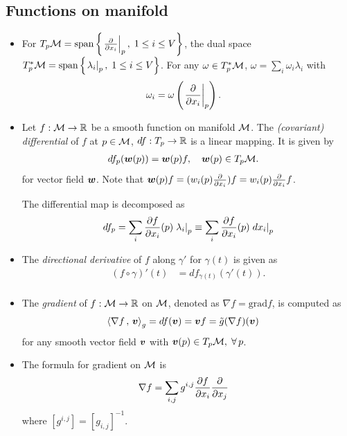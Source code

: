 \documentclass[11pt]{article}
\begin{document}
\subsection{Functions on manifold}
\begin{itemize}
\item For $T_{p}{\mathcal M} = \text{span}\left\{ \left.{\frac{\partial }{ \partial x_{i}}}\right\vert_{p},\; 1\le i\le V\right\}$, the dual space $T^{*}_{p}{\mathcal M}= \text{span}\left\{ \left.{\lambda_{i}}\right\vert_{p},\; 1\le i\le V\right\}$. For any $\omega \in T^{*}_{p}{\mathcal M}$, $\omega =\sum_{i} \omega_{i}\lambda_{i}$ with 
\begin{align*}
\omega_{i} &= \omega\left(\left.{\frac{\partial }{ \partial x_{i}}}\right\vert_{p}\right).
\end{align*}

\item Let $f: {\mathcal M} \rightarrow {\mathbb R}$ be a smooth function on manifold ${\mathcal M}$. The \emph{(covariant) differential} of $f$ at $p\in {\mathcal M}$, $df: T_{p} \rightarrow {\mathbb R}$ is a linear mapping. It is given by 
\begin{align*}
df_{p}(\boldsymbol{w}(p)) &= \boldsymbol{w}(p)f, \quad \boldsymbol{w}(p) \in T_{p}{\mathcal M}.
\end{align*} for vector field $\boldsymbol{w}$. Note that $\boldsymbol{w}(p)f= (w_{i}(p)\frac{\partial }{ \partial x_{i}})f=w_{i}(p)\frac{\partial }{ \partial x_{i}}f$.

The differential map is decomposed as
\begin{align*}
df_{p} &= \sum_{i} \frac{\partial f}{ \partial x_{i}}(p)\left.{\lambda_{i}}\right\vert_{p} \equiv \sum_{i} \frac{\partial f}{ \partial x_{i}}(p)\left.{dx_{i}}\right\vert_{p}\\
\end{align*}

\item The \emph{directional derivative} of $f$ along $\gamma'$ for $\gamma(t)$ is given as
\begin{align*}
(f\circ \gamma)'(t) &= df_{\gamma(t)}(\gamma'(t)).\\
\end{align*}

\item The \emph{gradient} of $f: {\mathcal M}\rightarrow {\mathbb R}$ on ${\mathcal M}$, denoted as $\nabla f = \text{grad} f$, is computed as 
\begin{align*}
\left\langle \nabla f\,,\, \boldsymbol{v} \right\rangle_{g} &= df(\boldsymbol{v}) = \boldsymbol{v}f = \tilde{g}(\nabla f)(\boldsymbol{v})
\end{align*} for any smooth vector field $\boldsymbol{v}$ with $\boldsymbol{v}(p)\in T_{p}{\mathcal M}, \;\forall\,p$.

\item The formula for gradient on ${\mathcal M}$ is
\begin{align*}
\nabla f&= \sum_{i,j} g^{i,j}\frac{\partial f}{ \partial x_{i}}\frac{\partial }{ \partial x_{j}}
\end{align*}
where $[g^{i,j}]= [g_{i,j}]^{-1}$.



\end{itemize}
\end{document}
